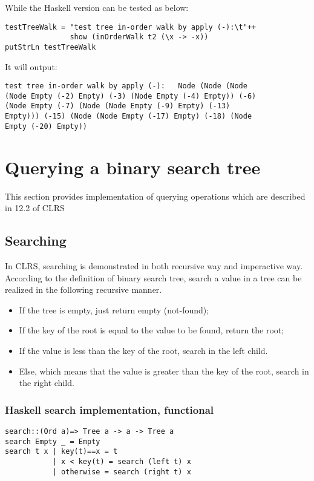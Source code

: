 \documentclass{article}
\begin{document}
While the Haskell version can be tested as below:

\lstset{language=Haskell}
\begin{lstlisting}
testTreeWalk = "test tree in-order walk by apply (-):\t"++
               show (inOrderWalk t2 (\x -> -x))
putStrLn testTreeWalk
\end{lstlisting}

It will output:
\begin{verbatim}
test tree in-order walk by apply (-):   Node (Node (Node 
(Node Empty (-2) Empty) (-3) (Node Empty (-4) Empty)) (-6) 
(Node Empty (-7) (Node (Node Empty (-9) Empty) (-13) 
Empty))) (-15) (Node (Node Empty (-17) Empty) (-18) (Node 
Empty (-20) Empty))
\end{verbatim}

\section{Querying a binary search tree}

This section provides implementation of querying operations which are
described in 12.2 of CLRS\cite{CLRS}

\subsection{Searching}
In CLRS\cite{CLRS}, searching is demonstrated in both recursive way and 
imperactive way. According to the definition of binary search tree, search
a value in a tree can be realized in the following recursive manner.

\begin{itemize}
\item If the tree is empty, just return empty (not-found);
\item If the key of the root is equal to the value to be found, 
return the root;
\item If the value is less than the key of the root, search in the left
child.
\item Else, which means that the value is greater than the key of the 
root, search in the right child.
\end{itemize}

\subsubsection*{Haskell search implementation, functional}
\lstset{language=Haskell}
\begin{lstlisting}
search::(Ord a)=> Tree a -> a -> Tree a
search Empty _ = Empty
search t x | key(t)==x = t
           | x < key(t) = search (left t) x
           | otherwise = search (right t) x
\end{lstlisting}
\end{document}
